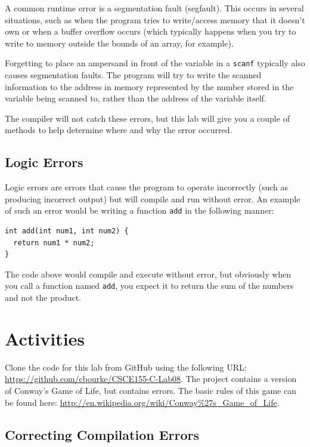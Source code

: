 \documentclass[12pt]{scrartcl}
\begin{document}
A common runtime error is a segmentation fault (segfault).  This occurs in 
several situations, such as when the program tries to write/access memory 
that it doesn't own or when a buffer overflow occurs (which typically happens 
when you try to write to memory outside the bounds of an array, for example).  

Forgetting to place an ampersand in front of the variable in a \texttt{scanf} 
typically also causes segmentation faults.  The program will try to write the 
scanned information to the address in memory represented by the number 
stored in the variable being scanned to, rather than the address of the variable 
itself.  

The compiler will not catch these errors, but this lab will give you a couple of 
methods to help determine where and why the error occurred.  

\subsection*{Logic Errors}

Logic errors are errors that cause the program to operate incorrectly (such 
as producing incorrect output) but will compile and run without error.  An 
example of such an error would be writing a function \texttt{add} 
in the following manner:

\begin{verbatim}
int add(int num1, int num2) {
  return num1 * num2;
}
\end{verbatim}

The code above would compile and execute without error, but obviously 
when you call a function named \texttt{add}, you expect it to return the sum of 
the numbers and not the product.  

\section{Activities}

Clone the code for this lab from GitHub using the following URL: 
\url{https://github.com/cbourke/CSCE155-C-Lab08}.  The project 
contains a version of Conway's Game of Life, but contains errors.
The basic rules of this game can be found here: 
\url{http://en.wikipedia.org/wiki/Conway%27s_Game_of_Life}.

\subsection{Correcting Compilation Errors}
\end{document}
